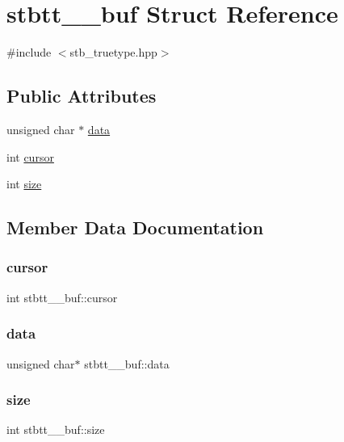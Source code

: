 \hypertarget{structstbtt____buf}{}\section{stbtt\+\_\+\+\_\+buf Struct Reference}
\label{structstbtt____buf}


{\ttfamily \#include $<$stb\+\_\+truetype.\+hpp$>$}

\subsection*{Public Attributes}
\begin{DoxyCompactItemize}
\item 
unsigned char $\ast$ \hyperlink{structstbtt____buf_a376d8cdacbc8295a7e88567ad52a0ac4}{data}
\item 
int \hyperlink{structstbtt____buf_ac047fda650726920531272c28aa354fb}{cursor}
\item 
int \hyperlink{structstbtt____buf_a0f6f2d06981ab4a5697233bbd0cafb5b}{size}
\end{DoxyCompactItemize}


\subsection{Member Data Documentation}
\hypertarget{structstbtt____buf_ac047fda650726920531272c28aa354fb}{}\label{structstbtt____buf_ac047fda650726920531272c28aa354fb} 
\subsubsection{\texorpdfstring{cursor}{cursor}}
{\footnotesize\ttfamily int stbtt\+\_\+\+\_\+buf\+::cursor}

\hypertarget{structstbtt____buf_a376d8cdacbc8295a7e88567ad52a0ac4}{}\label{structstbtt____buf_a376d8cdacbc8295a7e88567ad52a0ac4} 
\subsubsection{\texorpdfstring{data}{data}}
{\footnotesize\ttfamily unsigned char$\ast$ stbtt\+\_\+\+\_\+buf\+::data}

\hypertarget{structstbtt____buf_a0f6f2d06981ab4a5697233bbd0cafb5b}{}\label{structstbtt____buf_a0f6f2d06981ab4a5697233bbd0cafb5b} 
\subsubsection{\texorpdfstring{size}{size}}
{\footnotesize\ttfamily int stbtt\+\_\+\+\_\+buf\+::size}

